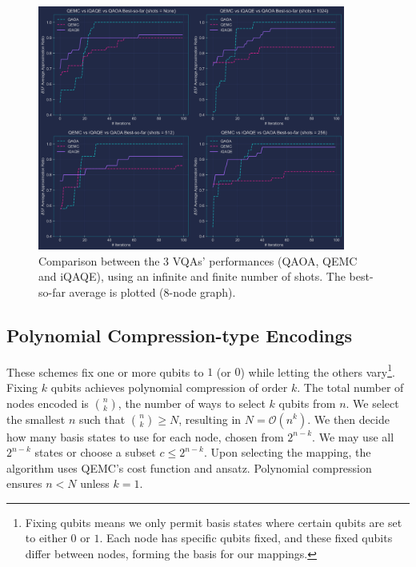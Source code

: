 \begin{figure}[t]
    \centering
    \includegraphics[width=0.90\textwidth]{Figures/Random_iQAQE_Updated.png}
    \caption{Comparison between the $3$ VQAs' performances (QAOA, QEMC and iQAQE), using an infinite and finite number of shots. The best-so-far average is plotted ($8$-node graph).}
    \label{fig:3_Comparison_shots}
\end{figure}

\subsection{Polynomial Compression-type Encodings}
\label{subsection:Polynomial_Encodings}
These schemes fix one or more qubits to $1$ (or $0$) while letting the others vary\footnote{Fixing qubits means we only permit basis states where certain qubits are set to either $0$ or $1$. Each node has specific qubits fixed, and these fixed qubits differ between nodes, forming the basis for our mappings.}. Fixing $k$ qubits achieves polynomial compression of order $k$. The total number of nodes encoded is $\binom{n}{k}$, the number of ways to select $k$ qubits from $n$. We select the smallest $n$ such that $\binom{n}{k} \geq N$, resulting in $N = \mathcal{O}(n^k)$. We then decide how many basis states to use for each node, chosen from $2^{n-k}$. We may use all $2^{n-k}$ states or choose a subset $c \leq 2^{n-k}$. Upon selecting the mapping, the algorithm uses QEMC's cost function and ansatz. Polynomial compression ensures $n < N$ unless $k = 1$.

